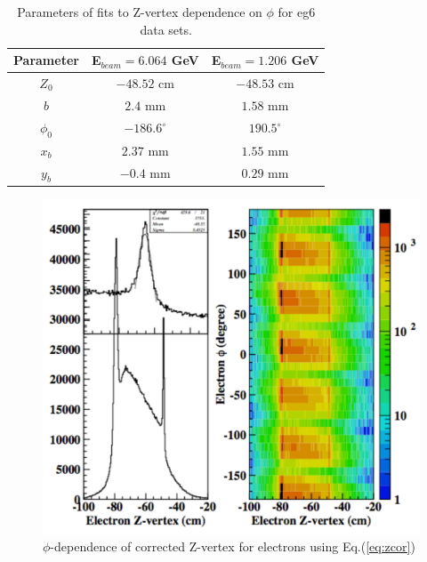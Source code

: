 \documentclass[12pt]{article}
\begin{document}
\begin{table}[htdp]
\caption{Parameters of fits to Z-vertex dependence on $\phi$ for eg6 data sets.}
\begin{center}
\begin{tabular}{|c|c|c|}
\hline
Parameter& E$_{beam}=6.064$ GeV & E$_{beam}=1.206$ GeV  \\
\hline
$Z_0$ &$-48.52$ cm& $-48.53$ cm \\
$b$ & $2.4$ mm& $1.58$ mm \\
$\phi_0$& $-186.6^\circ$&$190.5^\circ$ \\ \hline
$x_b$  & $2.37$ mm & $1.55$ mm \\
$y_b$  & $-0.4$ mm & $0.29$ mm \\
\hline
\end{tabular}
\end{center}
\label{tab:param}
\end{table}%

\begin{figure}[htbp]
\begin{center}
\includegraphics[width=.8\textwidth]{zelectron_corrected}
\caption{$\phi$-dependence of corrected Z-vertex for electrons using Eq.(\ref{eq:zcor})}
\label{fig:ezcor}
\end{center}
\end{figure}
\end{document}
